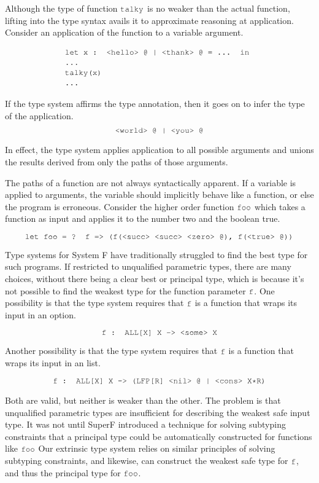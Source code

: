 \documentclass[acmsmall]{acmart}
\theoremstyle{definition}
\begin{document}
Although the type of function $\J{talky}$ is no weaker than the actual function,
lifting into the type syntax avails it to approximate reasoning at application.
Consider an application of the function to a variable argument. 

\[
  \begin{array}[t]{@{} l}
    \J{let x : <hello> @ | <thank> @ = ... in}
    \\
    \J{...}
    \\
    \J{talky(x)} 
    \\
    \J{...}
  \end{array}
\]

\noindent
If the type system affirms the type annotation,
then it goes on to infer the type of the application. 
\[
  \J{<world> @ | <you> @}
\]

\noindent
In effect, the type system applies application to all possible arguments
and unions the results derived from only the paths of those arguments. 

The paths of a function are not always syntactically apparent. 
If a variable is applied to arguments, the variable should implicitly behave 
like a function, or else the program is erroneous. 
Consider the higher order function $\J{foo}$ which takes a function as input
and applies it to the number two and the boolean true.

\[
  \J{let foo = ? f => (f(<succ> <succ> <zero> @), f(<true> @))}
\]

\noindent
Type systems for System F have traditionally struggled to find the best
type for such programs. If restricted to unqualified parametric types, there are many choices,
without there being a clear best or principal type, 
which is because it's not possible to find the weakest type for the function parameter
$\J{f}$.
One possibility is that the type system requires that $\J{f}$ is a function that wraps its
input in an option. 

\[
  \J{f : ALL[X] X -> <some> X}
\]

\noindent
Another possibility is that the type system requires that $\J{f}$ is a function that wraps its
input in an list. 

\[
  \J{f : ALL[X] X -> (LFP[R] <nil> @ | <cons> X*R)}
\]

\noindent
Both are valid, but neither is weaker than the other. The problem is that unqualified parametric
types are insufficient for describing the weakest safe input type.
It was not until SuperF introduced a technique for solving subtyping constraints
that a principal type could be automatically constructed for functions like $\J{foo}$
Our extrinsic type system relies on similar principles of solving subtyping constraints,
and likewise, can construct the weakest safe type for $\J{f}$, and thus the principal type for $\J{foo}$.
\end{document}
